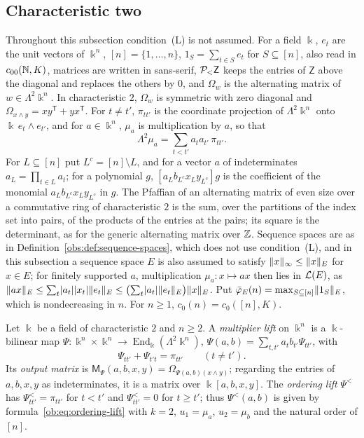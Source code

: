 \subsection{Characteristic two}\label{obs:ssec:char-two}
Throughout this subsection condition~\textup{(L)} is not assumed. For a field $\Bbbk$, $e_t$ are the unit vectors of $\Bbbk^n$,
$[n]=\{1,\dots,n\}$, $1_S=\sum_{t\in S}e_t$ for $S\subseteq[n]$, also read in $c_{00}(\mathbb N,K)$, matrices are
written in sans-serif, $\mathcal P_<\mathsf Z$ keeps the entries of $\mathsf Z$ above the diagonal and replaces the
others by $0$, and $\Omega_w$ is the alternating matrix of $w\in\Lambda^2\Bbbk^n$. In characteristic $2$, $\Omega_w$ is
symmetric with zero diagonal and $\Omega_{x\wedge y}=xy^{\mathsf T}+yx^{\mathsf T}$. For $t\ne t'$, $\pi_{tt'}$ is the
coordinate projection of $\Lambda^2\Bbbk^n$ onto $\Bbbk\,e_t\wedge e_{t'}$, and for $a\in\Bbbk^n$, $\mu_a$ is
multiplication by $a$, so that
\begin{equation}\label{obs:eq:lambda-mu}
\Lambda^2\mu_a=\sum_{t<t'}a_ta_{t'}\,\pi_{tt'} .
\end{equation}
For $L\subseteq[n]$ put $L^c=[n]\setminus L$, and for a vector $a$ of indeterminates $a_L=\prod_{t\in L}a_t$; for a
polynomial $g$, $[a_Lb_{L^c}x_Ly_{L^c}]g$ is the coefficient of the monomial $a_Lb_{L^c}x_Ly_{L^c}$ in $g$. The
Pfaffian of an alternating matrix of even size over a commutative ring of characteristic $2$ is the sum, over the
partitions of the index set into pairs, of the products of the entries at the pairs; its square is the determinant, as
for the generic alternating matrix over $\mathbb Z$. Sequence spaces are as in Definition~\ref{obs:def:sequence-spaces}, which
does not use condition~\textup{(L)}, and in this subsection a sequence space $E$ is also assumed to satisfy
$\lVert x\rVert_\infty\le\lVert x\rVert_E$ for $x\in E$; for finitely supported $a$, multiplication $\mu_a\colon x\mapsto ax$ then lies
in $\mathcal L(E)$, as $\lVert ax\rVert_E\le\sum_t\lvert a_t\rvert\lvert x_t\rvert\lVert e_t\rVert_E\le\bigl(\sum_t\lvert a_t\rvert\lVert e_t\rVert_E\bigr)\lVert x\rVert_E$.
Put $\bar\varphi_E(n)=\max_{S\subseteq[n]}\lVert 1_S\rVert_E$, which is nondecreasing in $n$. For $n\ge1$,
$c_0(n)=c_0([n],K)$.

Let $\Bbbk$ be a field of characteristic $2$ and $n\ge2$. A \emph{multiplier lift} on $\Bbbk^n$ is a $\Bbbk$-bilinear
map $\Psi\colon\Bbbk^n\times\Bbbk^n\to\operatorname{End}_\Bbbk(\Lambda^2\Bbbk^n)$,
$\Psi(a,b)=\sum_{t,t'}a_tb_{t'}\Psi_{tt'}$, with
\begin{equation}\label{obs:eq:multiplier-lift}
\Psi_{tt'}+\Psi_{t't}=\pi_{tt'}\qquad(t\ne t').
\end{equation}
Its \emph{output matrix} is $\mathsf M_\Psi(a,b,x,y)=\Omega_{\Psi(a,b)(x\wedge y)}$; regarding the entries of
$a,b,x,y$ as indeterminates, it is a matrix over $\Bbbk[a,b,x,y]$. The \emph{ordering lift} $\Psi^<$ has
$\Psi^<_{tt'}=\pi_{tt'}$ for $t<t'$ and $\Psi^<_{tt'}=0$ for $t\ge t'$; thus $\Psi^<(a,b)$ is given by
formula~\eqref{ob:eq:ordering-lift} with $k=2$, $u_1=\mu_a$, $u_2=\mu_b$ and the natural order of $[n]$.

